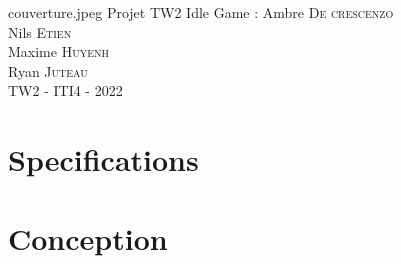 \documentclass[11pt,a4paper]{article}
\author{RJ-MH}
\begin{document}
\PageDeGarde
{couverture.jpeg} %
{Projet TW2} %
{Idle Game :} %
{
Ambre \textsc{De crescenzo}\\
Nils \textsc{Etien}\\
Maxime \textsc{Huyenh}\\%
Ryan \textsc{Juteau}\\

}
{TW2 - ITI4 - 2022} %



\tableofcontents

\clearpage




\clearpage

\section{Specifications}



\clearpage


\clearpage


\clearpage


\clearpage

\section{Conception}



\clearpage


\clearpage


\clearpage

\end{document}
